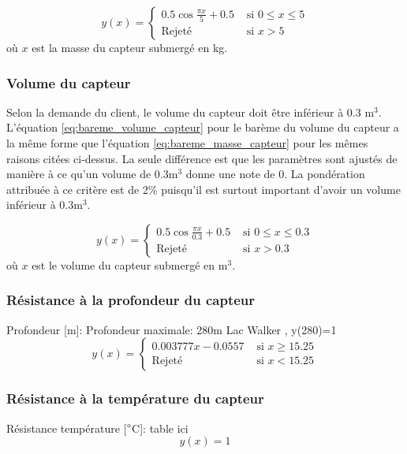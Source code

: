 \begin{equation}
y(x) = \begin{cases}
        0.5 \cos{\frac{\pi x}{5}} + 0.5 & \text{ si } 0 \le x \leq 5\\
        \text{Rejeté} & \text{ si } x > 5
    \end{cases}
    \label{eq:bareme_masse_capteur}
\end{equation}
où $x$ est la masse du capteur submergé en kg.

\subsubsection{Volume du capteur}


Selon la demande du client, le volume du capteur doit être inférieur à 0.3 m$^3$. L'équation \ref{eq:bareme_volume_capteur} pour le barème du volume du capteur a la même forme que l'équation \ref{eq:bareme_masse_capteur} pour les mêmes raisons citées ci-dessus. La seule différence est que les paramètres sont ajustés de manière à ce qu'un volume de 0.3m$^3$ donne une note de 0. La pondération attribuée à ce critère est de 2$\%$ puisqu'il est surtout important d'avoir un volume inférieur à 0.3m$^3$.

\begin{equation}
y(x) = \begin{cases}
        0.5 \cos{\frac{\pi x}{0.3}} + 0.5 & \text{ si }0 \le x \leq 0.3\\
        \text{Rejeté} & \text{ si } x > 0.3
    \end{cases}
    \label{eq:bareme_volume_capteur}
\end{equation}
où $x$ est le volume du capteur submergé en m$^3$.

\subsubsection{Résistance à la profondeur du capteur}
Profondeur [m]:
Profondeur maximale: 280m Lac Walker \cite{Lac_walker}, y(280)=1
\begin{equation}
y(x) = \begin{cases}
        0.003777x-0.0557 & \text{ si } x \geq 15.25\\
        \text{Rejeté} & \text{ si } x < 15.25
    \end{cases}
    \label{eq:bareme_profondeur}
\end{equation}

\subsubsection{Résistance à la température du capteur}
Résistance température [$\degree$C]: table ici
\begin{equation}
    y(x) = 1
    \label{eq:bareme_res_temperature}
\end{equation}

